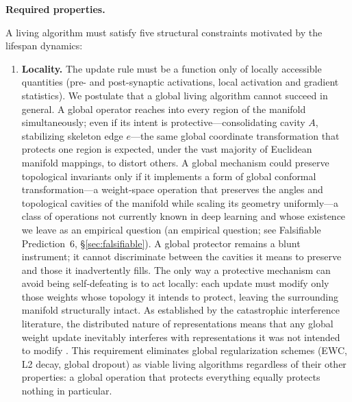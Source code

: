 \documentclass{article}
\begin{document}
\medskip
\noindent\textbf{Required properties.}

A living algorithm must satisfy five structural constraints motivated by the lifespan dynamics:

\begin{enumerate}
    \item \textbf{Locality.} The update rule must be a function only of locally accessible quantities (pre- and post-synaptic activations, local activation and gradient statistics). We postulate that a global living algorithm cannot succeed in general. A global operator reaches into every region of the manifold simultaneously; even if its intent is protective---consolidating cavity $A$, stabilizing skeleton edge $e$---the same global coordinate transformation that protects one region is expected, under the vast majority of Euclidean manifold mappings, to distort others. A global mechanism could preserve topological invariants only if it implements a form of global conformal transformation---a weight-space operation that preserves the angles and topological cavities of the manifold while scaling its geometry uniformly---a class of operations not currently known in deep learning and whose existence we leave as an empirical question (an empirical question; see Falsifiable Prediction~6, \S\ref{sec:falsifiable}). A global protector remains a blunt instrument; it cannot discriminate between the cavities it means to preserve and those it inadvertently fills. The only way a protective mechanism can avoid being self-defeating is to act locally: each update must modify only those weights whose topology it intends to protect, leaving the surrounding manifold structurally intact. As established by the catastrophic interference literature, the distributed nature of representations means that any global weight update inevitably interferes with representations it was not intended to modify \citep{McCloskey1989catastrophic,French1999catastrophic}. This requirement eliminates global regularization schemes (EWC, L2 decay, global dropout) as viable living algorithms regardless of their other properties: a global operation that protects everything equally protects nothing in particular.


\end{enumerate}
\end{document}
